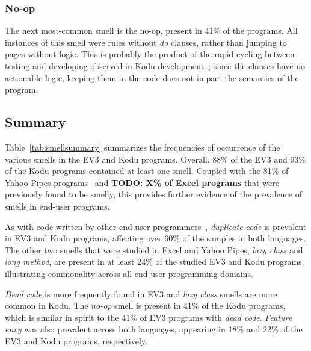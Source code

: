 \documentclass{sig-alternate}
\newcommand{\todo}[1]{\textbf{TODO: #1}}
\begin{document}
\subsubsection{No-op}
The next most-common smell is the no-op, present in 41\% of the programs. All instances of this smell were rules without \emph{do} clauses, rather than jumping to pages without logic. This is probably the product of the rapid cycling between testing and developing observed in Kodu development~\cite{Stolee:2011:ECS:1953163.1953197}; since the clauses have no actionable logic, keeping them in the code does not impact the semantics of the program. 

\subsection{Summary}
Table~\ref{tab:smellsummary} summarizes the frequencies of occurrence of the various smells in the  EV3 and Kodu programs. Overall, 88\% of the EV3 and 93\% of the Kodu programs contained at least one smell. Coupled with the 81\% of Yahoo Pipes programs~\cite{StoleeTSE2013} and \todo{X\% of Excel programs} that were previously found to be smelly, this provides further evidence of the prevalence of smells in end-user programs. 

As with code written by other end-user programmers~\cite{StoleeTSE2013}, \emph{duplicate code} is prevalent in EV3 and Kodu programs, affecting over 60\% of the samples in both languages. The other two smells that were studied in Excel and Yahoo Pipes, \emph{lazy class} and \emph{long method}, are present in at least 24\% of the studied EV3 and Kodu programs, illustrating commonality across all end-user programming domains. 

\emph{Dead code} is more frequently found in EV3 and \emph{lazy class} smells are more common in Kodu. The \emph{no-op} smell is present in 41\% of the Kodu programs, which is similar in spirit to the 41\% of EV3 programs with \emph{dead code}. \emph{Feature envy} was also prevalent across both languages, appearing in 18\% and 22\% of the EV3 and Kodu programs, respectively. 
\end{document}
